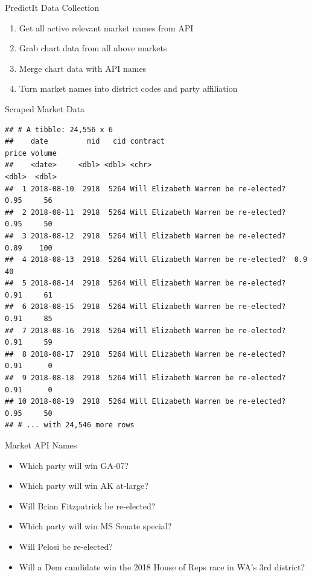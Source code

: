 \documentclass[ignorenonframetext,]{beamer}
\providecommand{\tightlist}{%
  \setlength{\itemsep}{0pt}\setlength{\parskip}{0pt}}
\begin{document}
\begin{frame}{PredictIt Data Collection}

\begin{enumerate}
\def\labelenumi{\arabic{enumi}.}
\tightlist
\item
  Get all active relevant market names from API
\item
  Grab chart data from all above markets
\item
  Merge chart data with API names
\item
  Turn market names into district codes and party affiliation
\end{enumerate}

\end{frame}

\begin{frame}[fragile]{Scraped Market Data}

\begin{verbatim}
## # A tibble: 24,556 x 6
##    date         mid   cid contract                             price volume
##    <date>     <dbl> <dbl> <chr>                                <dbl>  <dbl>
##  1 2018-08-10  2918  5264 Will Elizabeth Warren be re-elected?  0.95     56
##  2 2018-08-11  2918  5264 Will Elizabeth Warren be re-elected?  0.95     50
##  3 2018-08-12  2918  5264 Will Elizabeth Warren be re-elected?  0.89    100
##  4 2018-08-13  2918  5264 Will Elizabeth Warren be re-elected?  0.9      40
##  5 2018-08-14  2918  5264 Will Elizabeth Warren be re-elected?  0.91     61
##  6 2018-08-15  2918  5264 Will Elizabeth Warren be re-elected?  0.91     85
##  7 2018-08-16  2918  5264 Will Elizabeth Warren be re-elected?  0.91     59
##  8 2018-08-17  2918  5264 Will Elizabeth Warren be re-elected?  0.91      0
##  9 2018-08-18  2918  5264 Will Elizabeth Warren be re-elected?  0.91      0
## 10 2018-08-19  2918  5264 Will Elizabeth Warren be re-elected?  0.95     50
## # ... with 24,546 more rows
\end{verbatim}

\end{frame}

\begin{frame}{Market API Names}

\begin{itemize}
\tightlist
\item
  Which party will win GA-07?
\item
  Which party will win AK at-large?
\item
  Will Brian Fitzpatrick be re-elected?
\item
  Which party will win MS Senate special?
\item
  Will Pelosi be re-elected?
\item
  Will a Dem candidate win the 2018 House of Reps race in WA's 3rd
  district?
\end{itemize}

\end{frame}
\end{document}
